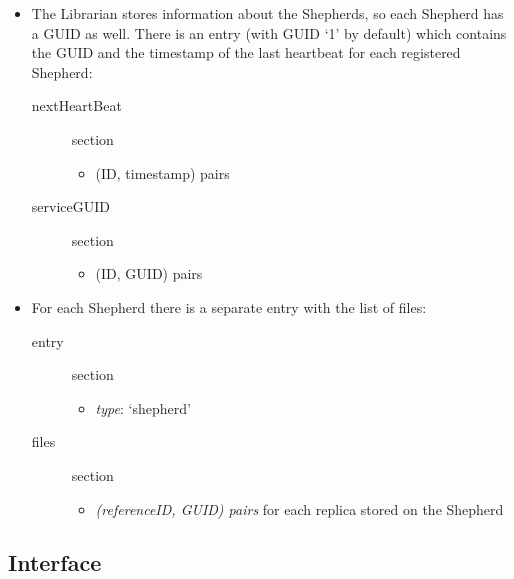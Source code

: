 \documentclass{book}
\begin{document}
\begin{itemize}
    \item The Librarian stores information about the Shepherds, so each Shepherd has a GUID as well. There is an entry (with GUID `1' by default) which contains the GUID and the timestamp of the last heartbeat for each registered Shepherd:
    \begin{description}
    	\item [nextHeartBeat] section
    	\begin{itemize}
    		\item (ID, timestamp) pairs
    	\end{itemize}
    	\item [serviceGUID] section
        \begin{itemize}
            \item (ID, GUID) pairs
        \end{itemize}
    \end{description}

    \item For each Shepherd there is a separate entry with the list of files:
    \begin{description}
    	\item [entry] section
        \begin{itemize}
            \item \emph{type}: `shepherd'
        \end{itemize}
    	\item [files] section
    	\begin{itemize}
    	    \item \emph{(referenceID, GUID) pairs} for each replica stored on the Shepherd
    	\end{itemize}
    \end{description}
\end{itemize}


\subsection{Interface} %
\end{document}

